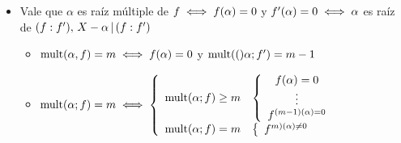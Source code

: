 \begin{itemize}
	\item Vale que $\alpha$ es raíz múltiple de $f \sisolosi f(\alpha) = 0$ y $f'(\alpha) = 0 \sisolosi \alpha$
	      es raíz de $(f:f'),\, X - \alpha \divideA (f:f')$
	      \begin{itemize}
		      \item $\mult{\alpha,f} = m \sisolosi f(\alpha) = 0$ y $\mult(\alpha;f') = m-1$

		      \item $\mult{\alpha;f} = m \sisolosi
			            \llave{rl}{
				            \mult{\alpha;f}\geq m     &
				            \llave{c}{
					            f(\alpha) = 0\\
					            \vdots\\
					            f^{(m-1)(\alpha) = 0}
				            }\\
				            \mult{\alpha;f} = m     &
				            \llave{c}{
					            f^{m)(\alpha) \distinto 0}
				            }
			            }$
	      \end{itemize}
\end{itemize}
